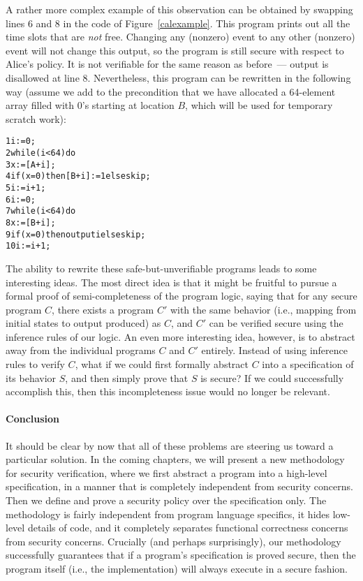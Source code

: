 A rather more complex example of this observation can be obtained by swapping 
lines 6 and 8 in the code of Figure~\ref{calexample}. This program prints out all 
the time slots that are \emph{not} free. Changing any (nonzero) event to any other 
(nonzero) event will not change this output, so the program is still secure with 
respect to Alice's policy. It is not verifiable for the same reason as before~--- output 
is disallowed at line 8. Nevertheless, this program can be rewritten in the following 
way (assume we add to the precondition that we have allocated a 64-element array filled 
with \lo{} 0's starting at location $B$, which will be used for temporary scratch work):
\begin{alltt}
1  i := 0;
2  while (i < 64) do
3      x := [A+i];
4      if (x = 0) then [B+i] := 1 else skip;
5      i := i+1;
6  i := 0;
7  while (i < 64) do
8      x := [B+i];
9      if (x = 0) then output i else skip;
10     i := i+1;
\end{alltt}
The ability to rewrite these safe-but-unverifiable programs leads to some
interesting ideas. The most direct idea is that it might be fruitful to
pursue a formal proof of semi-completeness of the program logic, saying that 
for any secure program $C$, there exists a program $C'$ with the same behavior
(i.e., mapping from initial states to output produced) as $C$, and $C'$ can
be verified secure using the inference rules of our logic. An even more interesting
idea, however, is to abstract away from the individual programs $C$ and $C'$
entirely. Instead of using inference rules to verify $C$, what if we could first 
formally abstract $C$ into a specification of its behavior $S$, and then simply prove
that $S$ is secure? If we could successfully accomplish this, then this
incompleteness issue would no longer be relevant.

\paragraph{Conclusion}
It should be clear by now that all of these problems are steering us toward
a particular solution. In the coming chapters, we will present a new
methodology for security verification, where we first abstract a program
into a high-level specification, in a manner that is completely independent 
from security concerns. Then we define and prove a security policy over the 
specification only. The methodology is fairly independent from program language
specifics, it hides low-level details of code, and it completely separates
functional correctness concerns from security concerns. Crucially (and perhaps
surprisingly), our methodology successfully guarantees that if a program's 
specification is proved secure, then the program itself (i.e., the implementation)
will always execute in a secure fashion.

